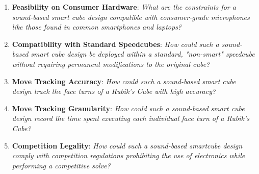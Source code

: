 \begin{enumerate}

    \item \textbf{Feasibility on Consumer Hardware}: \emph{What are the
    constraints for a sound-based smart cube design compatible with
    consumer-grade microphones like those found in common smartphones
    and laptops?}
    
    \item \textbf{Compatibility with Standard Speedcubes}: \emph{How
    could such a sound-based smart cube design be deployed within a
    standard, "non-smart" speedcube without requiring permanent
    modifications to the original cube?}
    
    
    \item \textbf{Move Tracking Accuracy}: \emph{How could such a
    sound-based smart cube design track the face turns of a Rubik's
    Cube with high accuracy?}
    
    
    \item \textbf{Move Tracking Granularity}: \emph{How could such a
    sound-based smart cube design record the time spent executing each
    individual face turn of a Rubik's Cube?}
    
    \item \textbf{Competition Legality}: \emph{How could such a
    sound-based smartcube design comply with competition regulations
    prohibiting the use of electronics while performing a competitive
    solve?}
    
\end{enumerate}
